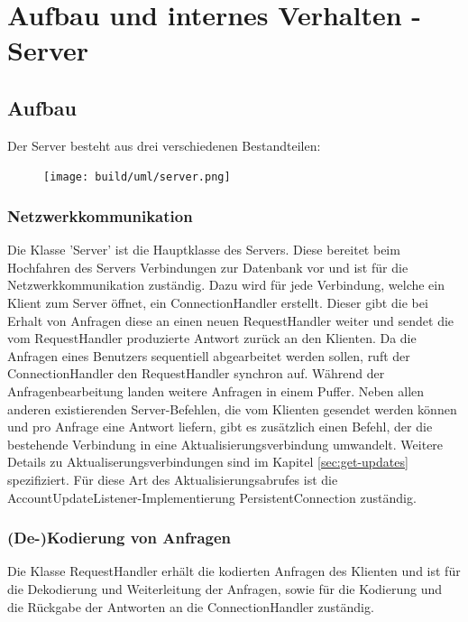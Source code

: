 \documentclass[parskip=full,11pt]{scrartcl}
\begin{document}
\pagebreak
\section{Aufbau und internes Verhalten - Server}

\subsection{Aufbau}
Der Server besteht aus drei verschiedenen Bestandteilen:

\begin{figure}[!htb]
    \centering
    \texttt{[image: build/uml/server.png]}
	\label{fig:serverclassdiagram}
\end{figure}

\subsubsection{Netzwerkkommunikation}
Die Klasse 'Server' ist die Hauptklasse des Servers.
Diese bereitet beim Hochfahren des Servers Verbindungen zur Datenbank vor und
ist für die Netzwerkkommunikation zuständig.
Dazu wird für jede Verbindung, welche ein Klient zum Server öffnet,
ein ConnectionHandler erstellt.
Dieser gibt die bei Erhalt von Anfragen diese an einen neuen RequestHandler
weiter und sendet die vom RequestHandler produzierte Antwort zurück an den
Klienten.
Da die Anfragen eines Benutzers sequentiell abgearbeitet werden sollen, ruft
der ConnectionHandler den RequestHandler synchron auf.
Während der Anfragenbearbeitung landen weitere Anfragen in einem Puffer.
Neben allen anderen existierenden Server-Befehlen, die vom Klienten gesendet
werden können und pro Anfrage eine Antwort liefern, gibt es zusätzlich einen
Befehl, der die bestehende Verbindung in eine Aktualisierungsverbindung
umwandelt.
Weitere Details zu Aktualiserungsverbindungen sind im Kapitel
\ref{sec:get-updates} spezifiziert.
Für diese Art des Aktualisierungsabrufes ist die
AccountUpdateListener-Implementierung PersistentConnection zuständig.

\subsubsection{(De-)Kodierung von Anfragen}
Die Klasse RequestHandler erhält die kodierten Anfragen des Klienten und
ist für die Dekodierung und Weiterleitung der Anfragen, sowie für
die Kodierung und die Rückgabe der Antworten an die ConnectionHandler zuständig.
\end{document}
